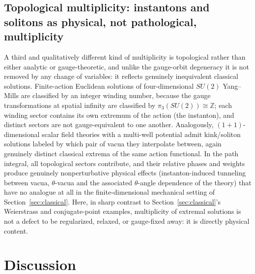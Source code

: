 \documentclass[11pt]{article}
\newcommand{\Z}{\mathbb{Z}}
\begin{document}
\subsection{Topological multiplicity: instantons and solitons as physical, not pathological, multiplicity}

A third and qualitatively different kind of multiplicity is topological rather than either analytic or gauge-theoretic, and unlike the gauge-orbit degeneracy it is not removed by any change of variables: it reflects genuinely inequivalent classical solutions. Finite-action Euclidean solutions of four-dimensional $SU(2)$ Yang--Mills are classified by an integer winding number, because the gauge transformations at spatial infinity are classified by $\pi_3(SU(2))\cong\Z$; each winding sector contains its own extremum of the action (the instanton), and distinct sectors are not gauge-equivalent to one another. Analogously, $(1{+}1)$-dimensional scalar field theories with a multi-well potential admit kink/soliton solutions labeled by which pair of vacua they interpolate between, again genuinely distinct classical extrema of the same action functional. In the path integral, all topological sectors contribute, and their relative phases and weights produce genuinely nonperturbative physical effects (instanton-induced tunneling between vacua, $\theta$-vacua and the associated $\theta$-angle dependence of the theory) that have no analogue at all in the finite-dimensional mechanical setting of Section~\ref{sec:classical}. Here, in sharp contrast to Section~\ref{sec:classical}'s Weierstrass and conjugate-point examples, multiplicity of extremal solutions is not a defect to be regularized, relaxed, or gauge-fixed away: it is directly physical content.

\section{Discussion}
\label{sec:discussion}
\end{document}
